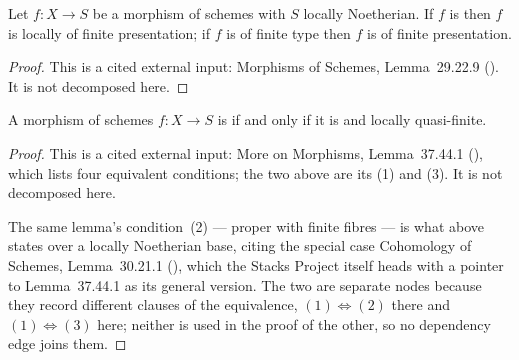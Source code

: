 \begin{lemma}
\label{lem:pc-finite-type-noetherian-fp}
Let $f:X\to S$ be a morphism of schemes with $S$ locally Noetherian.  If
$f$ is 
then $f$ is locally of finite presentation; if $f$ is of finite type
then $f$ is of finite presentation.
\end{lemma}
\begin{proof}
This is a cited external input: Morphisms of Schemes, Lemma~29.22.9
().  It is not
decomposed here.
\end{proof}

\begin{lemma}
\label{lem:pc-proper-quasi-finite-finite}
A morphism of schemes $f:X\to S$ is
 if and only if it is
 and locally quasi-finite.
\mathlibok\ 
\end{lemma}
\begin{proof}
This is a cited external input: More on Morphisms, Lemma~37.44.1
(), which lists four
equivalent conditions; the two above are its (1) and (3).  It is not
decomposed here.

The same lemma's condition~(2) --- proper with finite fibres --- is what
 above states over a
locally Noetherian base, citing the special case Cohomology of Schemes,
Lemma~30.21.1 (), which the Stacks Project itself
heads with a pointer to Lemma~37.44.1 as its general version.  The two
are separate nodes because they record different clauses of the
equivalence, $(1)\Leftrightarrow(2)$ there and
$(1)\Leftrightarrow(3)$ here; neither is used in the proof of the
other, so no dependency edge joins them.
\end{proof}

